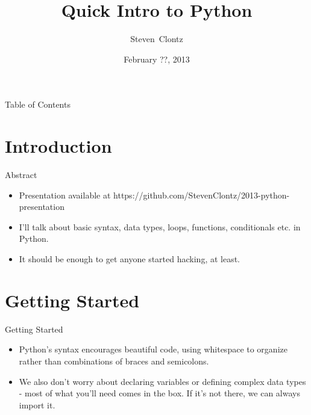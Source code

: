 \documentclass{beamer}
\title[Quick Intro to Python] %
{Quick Intro to Python}
\author%
{Steven~Clontz}%
\institute[Auburn University] %
{
  COMP 7970\\
  Auburn University}
\date[13-02-??] %
{February ??, 2013}
\begin{document}
\begin{frame}
  \titlepage
\end{frame}

\begin{frame}{Table of Contents}
  \tableofcontents
\end{frame}




\section{Introduction}

\begin{frame}{Abstract}%

  \begin{itemize}
  \item
    Presentation available at https://github.com/StevenClontz/2013-python-presentation
  \pause
  \item
    I'll talk about basic syntax, data types, loops, functions, conditionals etc. in Python.
    \pause
  \item
    It should be enough to get anyone started hacking, at least.
  \end{itemize}
\end{frame}

\section{Getting Started}

\begin{frame}{Getting Started}

  \begin{itemize}
  \item
    Python's syntax encourages beautiful code, using whitespace to organize rather than combinations of braces and semicolons.
  \pause
  \item
    We also don't worry about declaring variables or defining complex data types - most of what you'll need comes in the box.
  \pause
    If it's not there, we can always import it.
  \end{itemize}
\end{frame}
\end{document}
